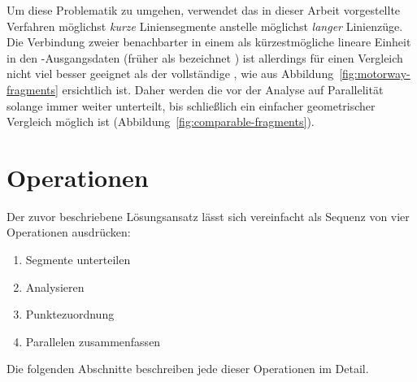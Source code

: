 \documentclass[../main/thesis.tex]{subfiles}
\begin{document}
Um diese Problematik zu umgehen, verwendet das in dieser Arbeit vorgestellte Verfahren möglichst \emph{kurze} Liniensegmente anstelle möglichst \emph{langer} Linienzüge.
Die Verbindung zweier benachbarter  in einem  als kürzestmögliche lineare Einheit in den \osm-Ausgangsdaten (früher als  bezeichnet ) ist allerdings für einen Vergleich nicht viel besser geeignet als der vollständige %
, wie aus Abbildung~\ref{fig:motorway-fragments} ersichtlich ist.
Daher werden die  vor der Analyse auf Parallelität solange immer weiter unterteilt, bis schließlich ein einfacher geometrischer Vergleich möglich ist (Abbildung~\ref{fig:comparable-fragments}).




\section{Operationen}
\label{ch:algorithm-parts}

Der zuvor beschriebene Lösungsansatz lässt sich vereinfacht als Sequenz von vier Operationen ausdrücken:
\begin{enumerate}[nosep]
	\item Segmente unterteilen
	\item Analysieren
	\item Punktezuordnung
	\item Parallelen zusammenfassen
\end{enumerate}
%
%
Die folgenden Abschnitte beschreiben jede dieser Operationen im Detail.
\end{document}
